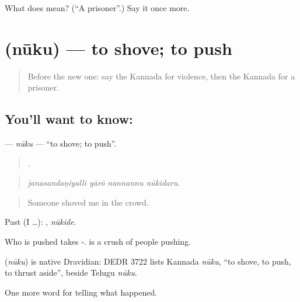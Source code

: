 \begin{tcolorbox}[breakable,colback=teal!4,colframe=teal!35!black,title={Before you move on}]
What does  mean? (\textquotedblleft{}A prisoner\textquotedblright{}.) Say it once more.
\end{tcolorbox}
\section[\texorpdfstring{\kn{ನೂಕು} (nūku)}{ನೂಕು (nūku)}]{ (nūku) — to shove; to push}

\label{lesson:KA-C365-nuku}



\begin{quote}
Before the new one: say the Kannada for violence, then the Kannada for a prisoner.
\end{quote}

\subsection*{You'll want to know: }
\textbf{} — \emph{nūku} — \textquotedblleft{}to shove; to push\textquotedblright{}.

\begin{quote}
   .
\end{quote}

\begin{quote}
\emph{janasandaṇiyalli yārō nannannu nūkidaru.}
\end{quote}

\begin{quote}
Someone shoved me in the crowd.
\end{quote}

Past (I …): , \emph{nūkide}.

Who is pushed takes -.  is a crush of people pushing.

\begin{cousinweb}
\textbf{} (\emph{nūku}) is native Dravidian: DEDR 3722 lists Kannada \emph{nūku}, \textquotedblleft{}to shove, to push, to thrust aside\textquotedblright{}, beside Telugu \emph{nūku}.
\end{cousinweb}

\begin{grammarlens}[title={What you've built}]
One more word for telling what happened.
\end{grammarlens}

